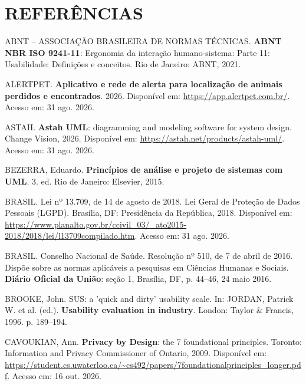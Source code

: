 \section*{REFERÊNCIAS}
{}

\begin{flushleft}
\singlespacing

\vspace{12pt}
\noindent ABNT -- ASSOCIAÇÃO BRASILEIRA DE NORMAS TÉCNICAS. \textbf{ABNT NBR ISO 9241-11}: Ergonomia da interação humano-sistema: Parte 11: Usabilidade: Definições e conceitos. Rio de Janeiro: ABNT, 2021.

\vspace{12pt}
\noindent ALERTPET. \textbf{Aplicativo e rede de alerta para localização de animais perdidos e encontrados}. 2026. Disponível em: \url{https://app.alertpet.com.br/}. Acesso em: 31 ago. 2026.

\vspace{12pt}
\noindent ASTAH. \textbf{Astah UML}: diagramming and modeling software for system design. Change Vision, 2026. Disponível em: \url{https://astah.net/products/astah-uml/}. Acesso em: 31 ago. 2026.

\vspace{12pt}
\noindent BEZERRA, Eduardo. \textbf{Princípios de análise e projeto de sistemas com UML}. 3. ed. Rio de Janeiro: Elsevier, 2015.

\vspace{12pt}
\noindent BRASIL. Lei nº 13.709, de 14 de agosto de 2018. Lei Geral de Proteção de Dados Pessoais (LGPD). Brasília, DF: Presidência da República, 2018. Disponível em: \url{https://www.planalto.gov.br/ccivil_03/_ato2015-2018/2018/lei/l13709compilado.htm}. Acesso em: 31 ago. 2026.

\vspace{12pt}
\noindent BRASIL. Conselho Nacional de Saúde. Resolução nº 510, de 7 de abril de 2016. Dispõe sobre as normas aplicáveis a pesquisas em Ciências Humanas e Sociais. \textbf{Diário Oficial da União}: seção 1, Brasília, DF, p. 44--46, 24 maio 2016.

\vspace{12pt}
\noindent BROOKE, John. SUS: a 'quick and dirty' usability scale. In: JORDAN, Patrick W. et al. (ed.). \textbf{Usability evaluation in industry}. London: Taylor \& Francis, 1996. p. 189--194.

\vspace{12pt}
\noindent CAVOUKIAN, Ann. \textbf{Privacy by Design}: the 7 foundational principles. Toronto: Information and Privacy Commissioner of Ontario, 2009. Disponível em: \url{https://student.cs.uwaterloo.ca/~cs492/papers/7foundationalprinciples_longer.pdf}. Acesso em: 16 out. 2026.


\end{flushleft}
